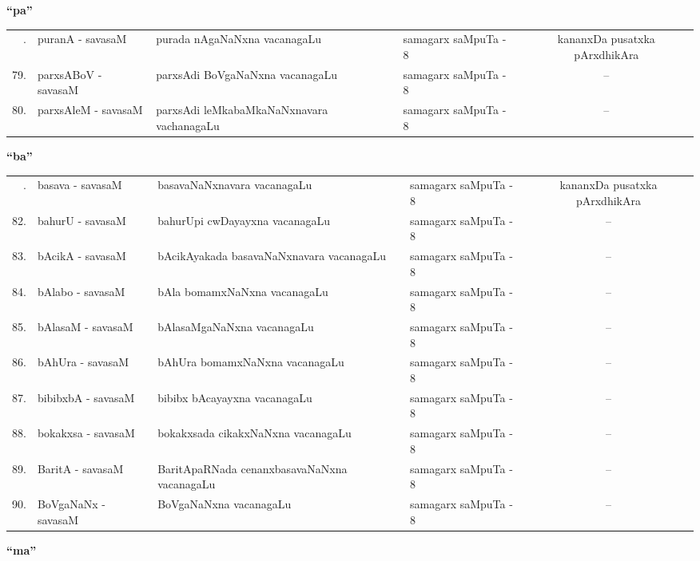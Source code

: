 \centerline{\bf ``pa''}

{\renewcommand{\arraystretch}{1.3}
\begin{longtable}{rl>{\raggedright}p{5.5cm}lc}
\hline
\endfirsthead
\hline
\endhead
\hline
\endfoot
\endlastfoot
78. & puranA - savasaM &  purada nAgaNaNxna vacanagaLu & samagarx saMpuTa - 8 & kananxDa pusatxka pArxdhikAra\\
79. & parxsABoV - savasaM & parxsAdi BoVgaNaNxna vacanagaLu & samagarx saMpuTa - 8 & --\\
80. & parxsAleM - savasaM & parxsAdi leMkabaMkaNaNxnavara vachanagaLu & samagarx saMpuTa - 8 & --\\
\hline
\end{longtable}}

\centerline{\bf ``ba''}

{\renewcommand{\arraystretch}{1.3}
\begin{longtable}{rl>{\raggedright}p{5.5cm}lc}
\hline
\endfirsthead
\hline
\endhead
\hline
\endfoot
\endlastfoot
81. & basava - savasaM & basavaNaNxnavara vacanagaLu & samagarx saMpuTa - 8 & kananxDa pusatxka pArxdhikAra\\
82. & bahurU - savasaM & bahurUpi cwDayayxna vacanagaLu & samagarx saMpuTa - 8 & --\\
83. & bAcikA - savasaM & bAcikAyakada basavaNaNxnavara vacanagaLu & samagarx saMpuTa - 8 & --\\
84. & bAlabo - savasaM & bAla bomamxNaNxna vacanagaLu & samagarx saMpuTa - 8 & --\\
85. & bAlasaM - savasaM & bAlasaMgaNaNxna vacanagaLu & samagarx saMpuTa - 8 & --\\
86. & bAhUra - savasaM & bAhUra bomamxNaNxna vacanagaLu & samagarx saMpuTa - 8 & --\\
87. & bibibxbA - savasaM & bibibx bAcayayxna vacanagaLu & samagarx saMpuTa - 8 & --\\
88. & bokakxsa - savasaM & bokakxsada cikakxNaNxna vacanagaLu & samagarx saMpuTa - 8 & --\\
89. & BaritA - savasaM & BaritApaRNada cenanxbasavaNaNxna vacanagaLu & samagarx saMpuTa - 8 & --\\
90. & BoVgaNaNx - savasaM & BoVgaNaNxna vacanagaLu & samagarx saMpuTa - 8 & --\\
\hline
\end{longtable}}

\centerline{\bf ``ma''}

